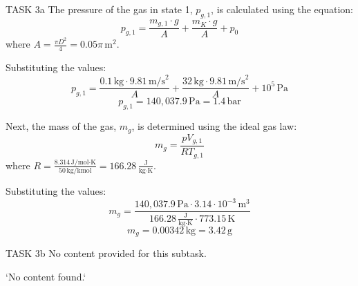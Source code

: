 TASK 3a  
The pressure of the gas in state 1, \( p_{g,1} \), is calculated using the equation:  
\[
p_{g,1} = \frac{m_{g,1} \cdot g}{A} + \frac{m_K \cdot g}{A} + p_0
\]  
where \( A = \frac{\pi D^2}{4} = 0.05 \pi \, \text{m}^2 \).  

Substituting the values:  
\[
p_{g,1} = \frac{0.1 \, \text{kg} \cdot 9.81 \, \text{m/s}^2}{A} + \frac{32 \, \text{kg} \cdot 9.81 \, \text{m/s}^2}{A} + 10^5 \, \text{Pa}
\]  
\[
p_{g,1} = 140,037.9 \, \text{Pa} = 1.4 \, \text{bar}
\]  

Next, the mass of the gas, \( m_g \), is determined using the ideal gas law:  
\[
m_g = \frac{p V_{g,1}}{R T_{g,1}}
\]  
where \( R = \frac{8.314 \, \text{J/mol·K}}{50 \, \text{kg/kmol}} = 166.28 \, \frac{\text{J}}{\text{kg·K}} \).  

Substituting the values:  
\[
m_g = \frac{140,037.9 \, \text{Pa} \cdot 3.14 \cdot 10^{-3} \, \text{m}^3}{166.28 \, \frac{\text{J}}{\text{kg·K}} \cdot 773.15 \, \text{K}}
\]  
\[
m_g = 0.00342 \, \text{kg} = 3.42 \, \text{g}
\]  

TASK 3b  
No content provided for this subtask.  

`No content found.`